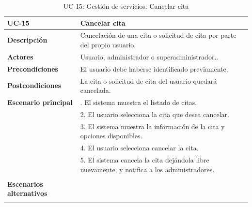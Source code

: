 \begin{table}
  \begin{center}
    \begin{tabularx}{16.4cm}{|l|X|}
      \hline
      \textbf{UC-15} & \textbf{Cancelar cita}\\
      \hline
      \textbf{Descripción} & Cancelación de una cita o solicitud de cita por parte del propio usuario. \\
      \hline
      \textbf{Actores} & Usuario, administrador o superadministrador..\\
      \hline
      \textbf{Precondiciones} & El usuario debe haberse identificado previamente.\\
      \hline
      \textbf{Postcondiciones} & La cita o solicitud de cita del usuario quedará cancelada.\\
      \hline
      \textbf{Escenario principal} & \smallskip 1. El sistema muestra el listado de citas.\\
      & 2. El usuario selecciona la cita que desea cancelar.\\
      & 3. El sistema muestra la información de la cita y opciones disponibles.\\
      & 4. El usuario selecciona cancelar la cita.\\
      & 5. El sistema cancela la cita dejándola libre nuevamente, y notifica a los administradores.\\
      & \\
      \hline
      \textbf{Escenarios alternativos} & \\
      & \\
      \hline
    \end{tabularx}
    \caption{UC-15: Gestión de servicios: Cancelar cita}
    \label{tab:CU-cancelar-cita}
  \end{center}
\end{table}


